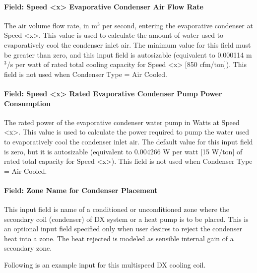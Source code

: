 \paragraph{Field: Speed \textless{}x\textgreater{} Evaporative Condenser Air Flow Rate}\label{field-speed-x-evaporative-condenser-air-flow-rate}

The air volume flow rate, in m\(^{3}\) per second, entering the evaporative condenser at Speed \textless{}x\textgreater{}. This value is used to calculate the amount of water used to evaporatively cool the condenser inlet air. The minimum value for this field must be greater than zero, and this input field is autosizable (equivalent to 0.000114 m\(^{3}\)/s per watt of rated total cooling capacity for Speed \textless{}x\textgreater{} {[}850 cfm/ton{]}). This field is not used when Condenser Type = Air Cooled.

\paragraph{Field: Speed \textless{}x\textgreater{} Rated Evaporative Condenser Pump Power Consumption}\label{field-speed-x-rated-evaporative-condenser-pump-power-consumption}

The rated power of the evaporative condenser water pump in Watts at Speed \textless{}x\textgreater{}. This value is used to calculate the power required to pump the water used to evaporatively cool the condenser inlet air. The default value for this input field is zero, but it is autosizable (equivalent to 0.004266 W per watt {[}15 W/ton{]} of rated total capacity for Speed \textless{}x\textgreater{}). This field is not used when Condenser Type = Air Cooled.

\paragraph{Field: Zone Name for Condenser Placement}\label{field-zone-name-for-condenser-placement-2}

This input field is name of a conditioned or unconditioned zone where the secondary coil (condenser) of DX system or a heat pump is to be placed. This is an optional input field specified only when user desires to reject the condenser heat into a zone. The heat rejected is modeled as sensible internal gain of a secondary zone.

Following is an example input for this multispeed DX cooling coil.

